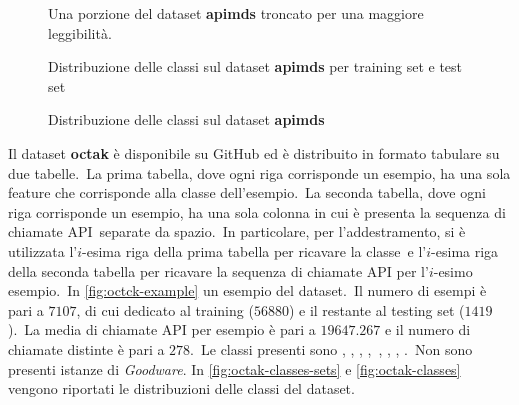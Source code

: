 \begin{figure}[h!]
    \centering
    \inputminted[fontsize=\small]{text}{validazione-empirica/files/apimds-example.csv}
    \caption{Una porzione del dataset \textbf{apimds} troncato per una maggiore leggibilità.}
    \label{fig:apimds-example}
\end{figure}

\begin{figure}[h!]
    \centering
    \caption{Distribuzione delle classi sul dataset \textbf{apimds} per training set e test set}
    \label{fig:apimds-classes-sets}
\end{figure}


\begin{figure}[h!]
    \centering
    \caption{Distribuzione delle classi sul dataset \textbf{apimds}}
    \label{fig:apimds-classes}
\end{figure}

\FloatBarrier


Il dataset \textbf{octak} è disponibile su GitHub ed è distribuito in formato tabulare su due tabelle.\
La prima tabella, dove ogni riga corrisponde un esempio, ha una sola feature che corrisponde alla classe dell'esempio.\
La seconda tabella, dove ogni riga corrisponde un esempio, ha una sola colonna in cui è presenta la sequenza di chiamate API\
separate da spazio.\
In particolare, per l'addestramento, si è utilizzata l'$i$-esima riga della prima tabella per ricavare la classe\
e l'$i$-esima riga della seconda tabella per ricavare la sequenza di chiamate API per l'$i$-esimo esempio.\
In \autoref{fig:octck-example} un esempio del dataset.\
Il numero di esempi è pari a $7107$, di cui  dedicato al training ($56880$) e il restante  al testing set ($1419$).\
La media di chiamate API per esempio è pari a $19647.267$ e il numero di chiamate distinte è pari a $278$.\
Le classi presenti sono , , , ,\
, , , .\
Non sono presenti istanze di \textit{Goodware}.
In \autoref{fig:octak-classes-sets} e \autoref{fig:octak-classes} vengono riportati le distribuzioni delle classi del dataset.

